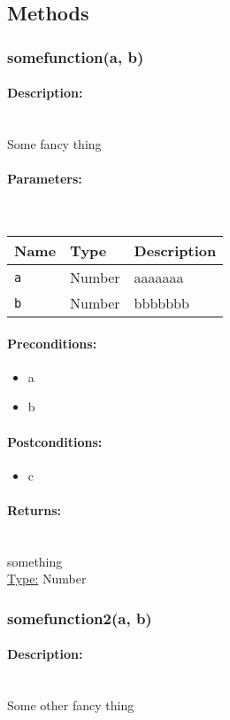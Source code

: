\subsection{Methods} 
\subsubsection{somefunction(a, b)} 
\paragraph{Description:} \hfill \\ 
Some fancy thing
\paragraph{Parameters:} \hfill \\ 
\begin{tabular}{|l|l|l|}
\hline
\textbf{Name} & \textbf{Type} & \textbf{Description} \\ 
\hline
\texttt{a} & Number & aaaaaaa\\ 
\hline
\texttt{b} & Number & bbbbbbb\\ 
\hline
\end{tabular}
\paragraph{Preconditions:} 
\begin{itemize}  
\item  a
\item  b
\end{itemize}  
\paragraph{Postconditions:}
\begin{itemize}  
\item  c
\end{itemize}  
\paragraph{Returns:} \hfill \\ 
something\\ 
\underline{Type:} Number
\subsubsection{somefunction2(a, b)} 
\paragraph{Description:} \hfill \\ 
Some other fancy thing
